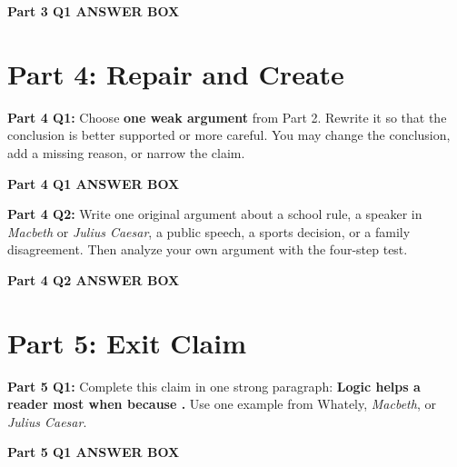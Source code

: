 \documentclass[12pt]{article}
\newcommand{\answerbox}[2]{%
\vspace{0.15em}
\noindent\textbf{#1}\par
\vspace{0.05em}
\noindent\fbox{%
\begin{minipage}[t][#2]{\dimexpr\textwidth-2\fboxsep-2\fboxrule}
\rule{\textwidth}{0pt}
\vspace{#2}
\end{minipage}
}\par
\vspace{0.25em}
}
\begin{document}
\answerbox{Part 3 Q1 ANSWER BOX}{2.75in}

\section*{Part 4: Repair and Create}

\textbf{Part 4 Q1:} Choose \textbf{one weak argument} from Part 2. Rewrite it so that the conclusion is better supported or more careful. You may change the conclusion, add a missing reason, or narrow the claim.

\answerbox{Part 4 Q1 ANSWER BOX}{1.8in}

\newpage

\textbf{Part 4 Q2:} Write one original argument about a school rule, a speaker in \textit{Macbeth} or \textit{Julius Caesar}, a public speech, a sports decision, or a family disagreement. Then analyze your own argument with the four-step test.

\answerbox{Part 4 Q2 ANSWER BOX}{2.65in}

\section*{Part 5: Exit Claim}

\textbf{Part 5 Q1:} Complete this claim in one strong paragraph: \textbf{Logic helps a reader most when \underline{\hspace{1.25in}} because \underline{\hspace{1.6in}}.} Use one example from Whately, \textit{Macbeth}, or \textit{Julius Caesar}.

\answerbox{Part 5 Q1 ANSWER BOX}{2.35in}
\end{document}
